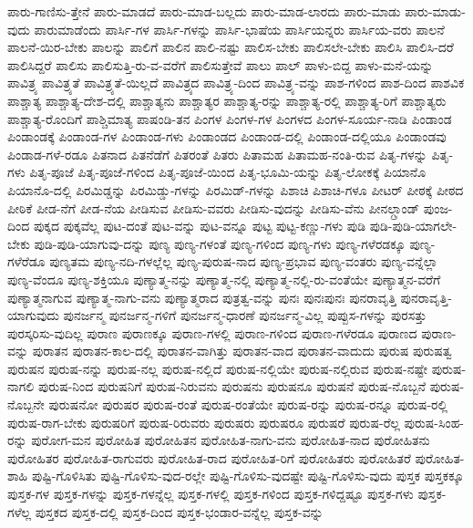 {ಪಾರು-ಗಾಣಿಸು-ತ್ತೇನೆ
ಪಾರು-ಮಾಡದೆ
ಪಾರು-ಮಾಡ-ಬಲ್ಲದು
ಪಾರು-ಮಾಡ-ಲಾರದು
ಪಾರು-ಮಾಡು
ಪಾರು-ಮಾಡು-ವುದು
ಪಾರುಮಾಡೆಂದು
ಪಾರ್ಸಿ-ಗಳ
ಪಾರ್ಸಿ-ಗಳನ್ನು
ಪಾರ್ಸಿ-ಭಾಷೆಯ
ಪಾರ್ಸಿಯನ್ನರು
ಪಾರ್ಸಿಯ-ವರು
ಪಾಲನೆ
ಪಾಲನೆ-ಯಿರ-ಬೇಕು
ಪಾಲನ್ನು
ಪಾಲಿಗೆ
ಪಾಲಿನ
ಪಾಲಿ-ನಷ್ಟು
ಪಾಲಿಸ-ಬೇಕು
ಪಾಲಿಸಲೇ-ಬೇಕು
ಪಾಲಿಸಿ
ಪಾಲಿಸಿ-ದರೆ
ಪಾಲಿಸಿದ್ದರೆ
ಪಾಲಿಸು
ಪಾಲಿಸುತ್ತಿ-ರು-ವ-ವರೆಗೆ
ಪಾಲಿಸುತ್ತೇವೆ
ಪಾಲು
ಪಾಲ್
ಪಾಳು-ಬಿದ್ದ
ಪಾಳು-ಮನೆ-ಯನ್ನು
ಪಾವಿತ್ರ್ಯ
ಪಾವಿತ್ರ್ಯತೆ
ಪಾವಿತ್ರ್ಯತೆ-ಯಿಲ್ಲದೆ
ಪಾವಿತ್ರ್ಯದ
ಪಾವಿತ್ರ್ಯ-ದಿಂದ
ಪಾವಿತ್ರ್ಯ-ವನ್ನು
ಪಾಶ-ಗಳಿಂದ
ಪಾಶ-ದಿಂದ
ಪಾಶವಿಕ
ಪಾಶ್ಚಾತ್ಯ
ಪಾಶ್ಚಾತ್ಯ-ದೇಶ-ದಲ್ಲಿ
ಪಾಶ್ಚಾತ್ಯನು
ಪಾಶ್ಚಾತ್ಯರ
ಪಾಶ್ಚಾತ್ಯ-ರನ್ನು
ಪಾಶ್ಚಾತ್ಯ-ರಲ್ಲಿ
ಪಾಶ್ಚಾತ್ಯ-ರಿಗೆ
ಪಾಶ್ಚಾತ್ಯರು
ಪಾಶ್ಚಾತ್ಯ-ರೊಂದಿಗೆ
ಪಾಶ್ಚಿಮಾತ್ಯ
ಪಾಷಂಡಿ-ತನ
ಪಿಂಗಳ
ಪಿಂಗಳ-ಗಳ
ಪಿಂಗಳದ
ಪಿಂಗಳ-ಸೂರ್ಯ-ನಾಡಿ
ಪಿಂಡಾಂಡ
ಪಿಂಡಾಂಡಕ್ಕೆ
ಪಿಂಡಾಂಡ-ಗಳ
ಪಿಂಡಾಂಡ-ಗಳು
ಪಿಂಡಾಂಡದ
ಪಿಂಡಾಂಡ-ದಲ್ಲಿ
ಪಿಂಡಾಂಡ-ದಲ್ಲಿಯೂ
ಪಿಂಡಾಂಡವು
ಪಿಂಡಾಡ-ಗಳೆ-ರಡೂ
ಪಿತನಾದ
ಪಿತನೆಡೆಗೆ
ಪಿತರಂತೆ
ಪಿತರು
ಪಿತಾಮಹ
ಪಿತಾಮಹ-ನಂತಿ-ರುವ
ಪಿತೃ-ಗಳನ್ನು
ಪಿತೃ-ಗಳು
ಪಿತೃ-ಪೂಜೆ
ಪಿತೃ-ಪೂಜೆ-ಗಳಿಂದ
ಪಿತೃ-ಪೂಜೆ-ಯಿಂದ
ಪಿತೃ-ಭೂಮಿ-ಯನ್ನು
ಪಿತೃ-ಲೋಕಕ್ಕೆ
ಪಿಯಾನೊ
ಪಿಯಾನೊ-ದಲ್ಲಿ
ಪಿರಮಿಡ್ಡನ್ನು
ಪಿರಮಿಡ್ಡು-ಗಳನ್ನು
ಪಿರಮಿಡ್-ಗಳನ್ನು
ಪಿಶಾಚಿ
ಪಿಶಾಚಿ-ಗಳೂ
ಪೀಟರ್
ಪೀಠಕ್ಕೆ
ಪೀಠದ
ಪೀಠಿಕೆ
ಪೀಡ-ನೆಗೆ
ಪೀಡ-ನೆಯ
ಪೀಡಿಸುವ
ಪೀಡಿಸು-ವವರು
ಪೀಡಿಸು-ವುದನ್ನು
ಪೀಡಿಸು-ವೆನು
ಪೀನಲ್ಗ್ರಾಂಡ್
ಪುಂಜ-ದಿಂದ
ಪುಕ್ಕದ
ಪುಕ್ಕವೆಲ್ಲ
ಪುಟ-ದಂತೆ
ಪುಟ-ವನ್ನು
ಪುಟ-ವನ್ನೂ
ಪುಟ್ಟ
ಪುಟ್ಟ-ಕಣ್ಣು-ಗಳು
ಪುಡಿ
ಪುಡಿ-ಪುಡಿ-ಯಾಗಲೇ-ಬೇಕು
ಪುಡಿ-ಪುಡಿ-ಯಾಗುವು-ದನ್ನು
ಪುಣ್ಯ
ಪುಣ್ಯ-ಗಳಂತೆ
ಪುಣ್ಯ-ಗಳಿಂದ
ಪುಣ್ಯ-ಗಳು
ಪುಣ್ಯ-ಗಳೆರಡಕ್ಕೂ
ಪುಣ್ಯ-ಗಳೆರೆಡೂ
ಪುಣ್ಯತಮ
ಪುಣ್ಯ-ನದಿ-ಗಳಲ್ಲೆಲ್ಲ
ಪುಣ್ಯ-ಪುರುಷ-ನಾದ
ಪುಣ್ಯ-ಪ್ರಭಾವ
ಪುಣ್ಯ-ವಂತರು
ಪುಣ್ಯ-ವನ್ನೆಲ್ಲಾ
ಪುಣ್ಯ-ವೆಂದೂ
ಪುಣ್ಯ-ಶಕ್ತಿಯೂ
ಪುಣ್ಯಾತ್ಮ-ನನ್ನು
ಪುಣ್ಯಾತ್ಮ-ನಲ್ಲಿ
ಪುಣ್ಯಾತ್ಮ-ನಲ್ಲಿ-ರು-ವಂತೆಯೇ
ಪುಣ್ಯಾತ್ಮನ-ವರೆಗೆ
ಪುಣ್ಯಾತ್ಮನಾಗುವ
ಪುಣ್ಯಾತ್ಮ-ನಾಗು-ವನು
ಪುಣ್ಯಾತ್ಮರಾದ
ಪುತ್ರತ್ವ-ವನ್ನು
ಪುನಃ
ಪುನಃಪುನಃ
ಪುನರಾವೃತ್ತಿ
ಪುನರಾವೃತ್ತಿ-ಯಾಗುವುದು
ಪುನರ್ಜನ್ಮ
ಪುನರ್ಜನ್ಮ-ಗಳಿಗೆ
ಪುನರ್ಜನ್ಮ-ಧಾರಣೆ
ಪುನರ್ಜನ್ಮ-ವಿಲ್ಲ
ಪುಪ್ಪುಸ-ಗಳನ್ನು
ಪುರಸತ್ತು
ಪುರಸ್ಕರಿಸು-ವುದಿಲ್ಲ
ಪುರಾಣ
ಪುರಾಣಕ್ಕೂ
ಪುರಾಣ-ಗಳಲ್ಲಿ
ಪುರಾಣ-ಗಳಿಂದ
ಪುರಾಣ-ಗಳೆರಡೂ
ಪುರಾಣದ
ಪುರಾಣ-ವನ್ನು
ಪುರಾತನ
ಪುರಾತನ-ಕಾಲ-ದಲ್ಲಿ
ಪುರಾತನ-ವಾಗಿತ್ತು
ಪುರಾತನ-ವಾದ
ಪುರಾತನ-ವಾದುದು
ಪುರುಷ
ಪುರುಷತ್ವ
ಪುರುಷನ
ಪುರುಷ-ನನ್ನು
ಪುರುಷ-ನಲ್ಲ
ಪುರುಷ-ನಲ್ಲಿದೆ
ಪುರುಷ-ನಲ್ಲಿಯೇ
ಪುರುಷ-ನಲ್ಲಿರುವ
ಪುರುಷ-ನಷ್ಟೇ
ಪುರುಷ-ನಾಗಲಿ
ಪುರುಷ-ನಿಂದ
ಪುರುಷನಿಗೆ
ಪುರುಷ-ನಿರುವನು
ಪುರುಷನು
ಪುರುಷನೂ
ಪುರುಷನೆ
ಪುರುಷ-ನೊಬ್ಬನೆ
ಪುರುಷ-ನೊಬ್ಬನೇ
ಪುರುಷನೋ
ಪುರುಷರ
ಪುರುಷ-ರಂತೆ
ಪುರುಷ-ರಂತೆಯೇ
ಪುರುಷ-ರನ್ನು
ಪುರುಷ-ರನ್ನೂ
ಪುರುಷ-ರಲ್ಲಿ
ಪುರುಷ-ರಾಗ-ಬೇಕು
ಪುರುಷರಿಗೆ
ಪುರುಷ-ರಿರುವರು
ಪುರುಷರು
ಪುರುಷರೂ
ಪುರುಷರೆ
ಪುರುಷ-ರೆಲ್ಲ
ಪುರುಷ-ಸಿಂಹ-ರನ್ನು
ಪುರೋಗ-ಮನ
ಪುರೋಹಿತ
ಪುರೋಹಿತನ
ಪುರೋಹಿತ-ನಾಗು-ವನು
ಪುರೋಹಿತ-ನಾದ
ಪುರೋಹಿತನು
ಪುರೋಹಿತರ
ಪುರೋಹಿತ-ರಾಗುವರು
ಪುರೋಹಿತ-ರಾದ
ಪುರೋಹಿತ-ರಿಗೆ
ಪುರೋಹಿತರು
ಪುರೋಹಿತರೆ
ಪುರೋಹಿತ-ಶಾಹಿ
ಪುಷ್ಟಿ-ಗೊಳಿಸಿತು
ಪುಷ್ಟಿ-ಗೊಳಿಸು-ವುದ-ರಲ್ಲೇ
ಪುಷ್ಟಿ-ಗೊಳಿಸು-ವುದಷ್ಟೇ
ಪುಷ್ಟಿ-ಗೊಳಿಸು-ವುದು
ಪುಸ್ತಕ
ಪುಸ್ತಕಕ್ಕೂ
ಪುಸ್ತಕ-ಗಳ
ಪುಸ್ತಕ-ಗಳನ್ನು
ಪುಸ್ತಕ-ಗಳನ್ನೆಲ್ಲ
ಪುಸ್ತಕ-ಗಳಲ್ಲಿ
ಪುಸ್ತಕ-ಗಳಿಂದ
ಪುಸ್ತಕ-ಗಳಿದ್ದಷ್ಟೂ
ಪುಸ್ತಕ-ಗಳು
ಪುಸ್ತಕ-ಗಳೆಲ್ಲ
ಪುಸ್ತಕದ
ಪುಸ್ತಕ-ದಲ್ಲಿ
ಪುಸ್ತಕ-ದಿಂದ
ಪುಸ್ತಕ-ಭಂಡಾರ-ವನ್ನೆಲ್ಲ
ಪುಸ್ತಕ-ವನ್ನು
}
